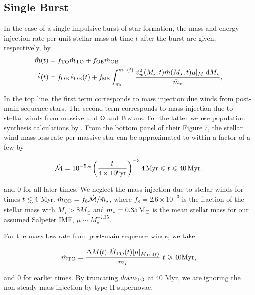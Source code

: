 
\subsection{Single Burst}

In the case of a single impulsive burst of star formation, the mass
and energy injection rate per unit stellar mass at time $t$ after the
burst are given, respectively, by
\begin{align} 
  \dot{\bar{m}}(t) &= f_{\rm TO} \dot{m}_{\rm TO} + f_{\rm OB}
  \dot{m}_{\rm OB}\\
\dot{\bar{e}}(t) &=f_{\rm OB} \, \dot{e}_{\rm OB}(t)+ f_{\rm MS}
\int_{m_0}^{m_{\rm T}(t)} \frac{\vw^2(\Mstar, t) \dot{m}(\Mstar, t)
  \mu|_{\Mstar} {\rm d}\Mstar}{\bar{m}_*},
  \label{eq:edotImp}
\end{align} 

In the top line, the first term corresponds to mass injection due
winds from post-main sequence stars. The second term corresponds to
mass injection due to stellar winds from massive and O and B
stars. For the latter we use population synthesis calculations by
\citet{VossDiehl+:2009a}. From the bottom panel of their Figure 7, the
stellar wind mass loss rate per massive star can be approximated to within
a factor of a few by

\begin{equation}
\dot{\mathcal{M}}=10^{-5.4} \left(\frac{t}{4\times 10^6 {\rm
       yr}}\right)^{-3} 4 {\, \rm Myr} \leq t \leq 40 {\, \rm Myr}. 
\end{equation}

and 0 for all later times. We neglect the mass injection due to
stellar winds for times $t\lsim 4$ Myr. $\dot{m}_{\rm OB}=f_{8}
\dot{\mathcal{M}}/\bar{m}_{\star}$, where $f_{8} =2.6 \times 10^{-3}$
is the fraction of the stellar mass with $M_{\star} > 8M_{\odot}$ and
$m_{\star}=0.35 \Msun$ is the mean stellar mass for our assumed
Salpeter IMF, $\mu\sim M_\star^{-2.35}$.

For the mass loss rate from post-main sequence winds, we take

\begin{equation}
  \dot{m}_{\rm TO}=\frac{\Delta M(t) |\dot{M}_{\rm TO}(t)|
    \mu|_{M_{\rm TO}(t)}}{\bar{m}_{\star}}  \,\,  t \geq {\rm 40 Myr},
\end{equation}

and 0 for earlier times. By truncating $dot{m}_{\rm TO}$ at 40 Myr, we
are ignoring the non-steady mass injection by type II supernovae.

